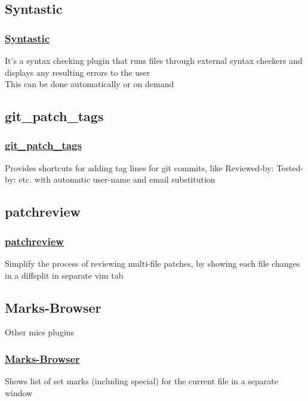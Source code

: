 \documentclass[14pt,svgnames,compress]{beamer}
\newcommand\hl[1]{\textcolor{HlColor}{#1}}
\newcommand\framesubtitlefontsize{\huge}
\newcommand\singleframesubtitle[1]{
    \begin{center}
        \framesubtitlefontsize #1
    \end{center}
}
\begin{document}
\subsection{Syntastic}

\begin{frame}
    \frametitle{
        \href{http://github.com/vim-scripts/Syntastic}
             {Syntastic}
    }
    \large
    It's a syntax checking plugin that runs files through external syntax
    checkers and displays any resulting errors to the user \\
    This can be done automatically or on demand \\
\end{frame}


\subsection{git\_patch\_tags}

\begin{frame}
    \frametitle{
        \href{https://github.com/vim-scripts/git\_patch\_tags.vim}
             {git\_patch\_tags}
    }
    \large
    Provides shortcuts for adding tag lines for git commits, like
    \hl{Reviewed-by:} \hl{Tested-by:} etc. with automatic user-name and email
    substitution \\
\end{frame}


\subsection{patchreview}

\begin{frame}
    \frametitle{
        \href{http://github.com/vim-scripts/patchreview.vim}
             {patchreview}
    }
    \large
    Simplify the process of reviewing multi-file patches, by showing each file
    changes in a diffsplit in separate vim tab \\
\end{frame}



\subsection{Marks-Browser}

\begin{frame}
    \singleframesubtitle{Other mics plugins}
\end{frame}

\begin{frame}
    \frametitle{
        \href{https://github.com/vim-scripts/Marks-Browser}
             {Marks-Browser}
    }
    \large
    Shows list of set marks (including special) for the current file in a
    separate window \\
\end{frame}
\end{document}
